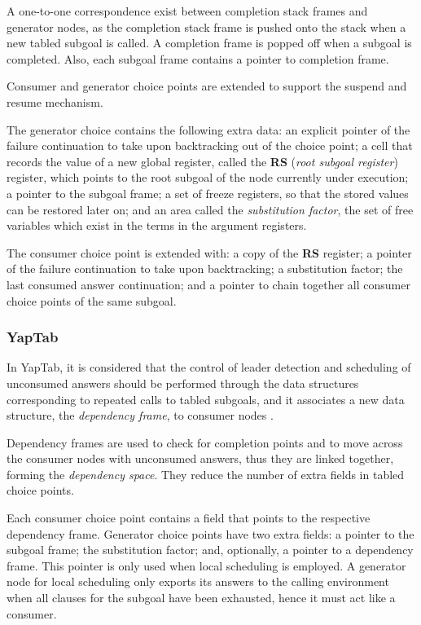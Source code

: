   A one-to-one correspondence exist between completion stack frames and generator nodes, as the completion stack frame
  is pushed onto the stack when a new tabled subgoal is called. A completion frame is popped off when a subgoal is
  completed. Also, each subgoal frame contains a pointer to completion frame.
  
  Consumer and generator choice points are extended to support the suspend and resume mechanism.
  
  The generator choice contains the following extra data: an explicit pointer of the failure continuation to take
  upon backtracking out of the choice point; a cell that records the value of a new global register,
  called the \textbf{RS} (\textit{root subgoal register}) register,
  which points to the root subgoal of the node currently under execution;
  a pointer to the subgoal frame; a set of freeze registers, so that the stored values can be restored later on;
  and an area called the \textit{substitution factor}, the set of free variables which exist in the terms in the argument registers.
  
  The consumer choice point is extended with: a copy of the \textbf{RS} register; a pointer of the failure continuation to take
  upon backtracking; a substitution factor; the last consumed answer continuation; and a pointer to chain
  together all consumer choice points of the same subgoal. 

  \subsubsection{YapTab}
  
  In YapTab, it is considered that the control of leader detection and scheduling of unconsumed answers should be
  performed through the data structures corresponding to repeated calls to tabled subgoals, and it associates a new
  data structure, the \textit{dependency frame}, to consumer nodes \cite{Rocha-03c}.
  
  Dependency frames are used to check for completion points and to move across the consumer nodes with unconsumed answers,
  thus they are linked together, forming the \textit{dependency space}.
  They reduce the number of extra fields in tabled choice points.
  
  Each consumer choice point contains a field that points to the respective dependency frame. Generator choice points
  have two extra fields: a pointer to the subgoal frame; the substitution factor; and, optionally, a pointer to a dependency frame. This pointer
  is only used when local scheduling is employed. A generator node for local scheduling only exports its answers to the calling
  environment when all clauses for the subgoal have been exhausted, hence it must act like a consumer.
  
